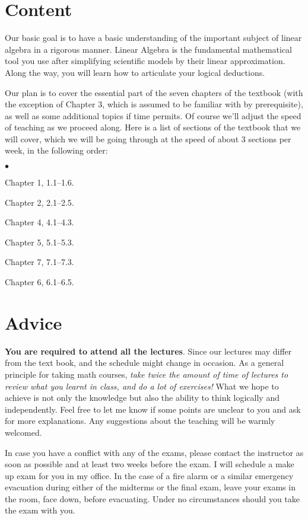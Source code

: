 \documentclass[margin,line]{res}
\newenvironment{list2}{
  \begin{list}{$\bullet$}{%
      \setlength{\itemsep}{0in}
      \setlength{\parsep}{0in} \setlength{\parskip}{0in}
      \setlength{\topsep}{0in} \setlength{\partopsep}{0in}
      \setlength{\leftmargin}{0.2in}}}{\end{list}}
\begin{document}
\begin{resume}
\section{\sc Content}
Our basic goal is to have a basic understanding of the important subject of linear algebra in a rigorous manner. Linear Algebra is the fundamental mathematical tool you use after simplifying scientific models by their linear approximation. Along the way, you will learn how to articulate your logical deductions. 

 Our plan is to cover the essential part of the seven chapters of the textbook (with the exception of Chapter 3, which is assumed to be familiar with by prerequisite), as well as some additional topics if time permits. Of course we'll adjust the speed of teaching as we proceed along. Here is a list of sections of the textbook that we will cover, which we will be going through at the speed of about 3 sections per week, in the following order:
\begin{list2}
\item Chapter 1, 1.1--1.6.
\item Chapter 2, 2.1--2.5.
\item Chapter 4, 4.1--4.3.
\item Chapter 5, 5.1--5.3.
\item Chapter 7, 7.1--7.3.
\item Chapter 6, 6.1--6.5.
\end{list2}

\section{\sc Advice}
{\bf You are required to attend all the lectures}. Since our
lectures may differ from the text book, and the
schedule might change in occasion. As a general principle for
taking math courses, \emph{take twice the amount of time of lectures
to review what you learnt in class, and do a lot of exercises!} What
we hope to achieve is not only the knowledge but also the ability
to think logically and independently. Feel free to let me know if
some points are unclear to you and ask for more explanations. Any
suggestions about the teaching will be warmly welcomed.

In case you have a conflict with any of the exams, please contact the
instructor as soon as possible and at least two weeks before the
exam. I will schedule a make up exam for you in my office. In the case of a fire alarm or a similar emergency evacuation during either of the midterms or the final exam, leave your exams in the room, face down, before evacuating. Under no circumstances should you take the exam with you.



\end{resume}
\end{document}
